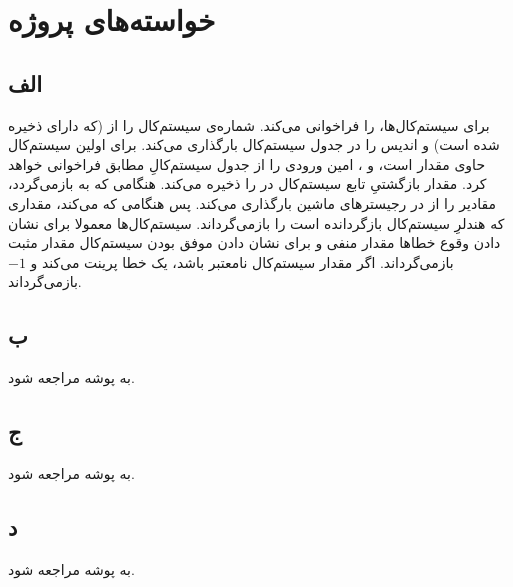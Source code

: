 \documentclass{article}
\begin{document}


\tableofcontents
\newpage
\section{}
\section{}
\section{}
\section{خواسته‌های پروژه}

\subsection{الف}
 برای سیستم‌کال‌ها،  را فراخوانی می‌کند.  شماره‌ی سیستم‌کال را از (که دارای  ذخیره شده است) و اندیس را در جدول سیستم‌کال بارگذاری می‌کند.  برای اولین سیستم‌کال حاوی مقدار  است، و ، امین ورودی را از جدول سیستم‌کالِ مطابق  فراخوانی خواهد کرد.
\newline
{} مقدار بازگشتیِ تابع سیستم‌کال در  را ذخیره می‌کند. هنگامی که  به  بازمی‌گردد، مقادیر را از  در رجیسترهای ماشین بارگذاری می‌کند. پس هنگامی که   می‌کند، مقداری که هندلرِ سیستم‌کال بازگردانده است را بازمی‌گرداند. سیستم‌کال‌ها معمولا برای نشان دادن وقوع خطاها مقدار منفی و برای نشان دادن موفق بودن سیستم‌کال مقدار مثبت بازمی‌گرداند. اگر مقدار سیستم‌کال نامعتبر باشد،  یک خطا پرینت می‌کند و 
$-1$
 بازمی‌گرداند.

\subsection{ب}
به پوشه  مراجعه شود.
\subsection{ج}
به پوشه  مراجعه شود.
\subsection{د}
به پوشه  مراجعه شود.
\end{document}

